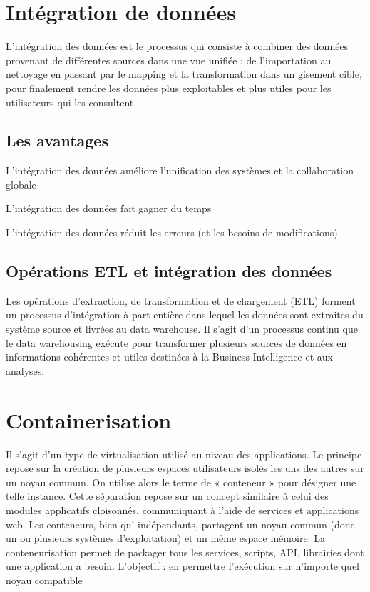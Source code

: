 \section{Intégration de données}
L’intégration des données est le processus qui consiste à combiner des données provenant de différentes
sources dans une vue unifiée : de l’importation au nettoyage en passant par le mapping et la transformation dans un gisement cible, pour finalement rendre les données plus exploitables et plus utiles pour les
utilisateurs qui les consultent.
\subsection{Les avantages}
\begin{list}{•}
	\item L’intégration des données améliore l’unification des systèmes et la collaboration globale
	\item L’intégration des données fait gagner du temps
	\item L’intégration des données réduit les erreurs (et les besoins de modifications)
\end{list}
\subsection{Opérations ETL et intégration des données}
Les opérations d’extraction, de transformation et de chargement (ETL) forment un processus d’intégration
à part entière dans lequel les données sont extraites du système source et livrées au data warehouse. Il s’agit
d’un processus continu que le data warehousing exécute pour transformer plusieurs sources de données en
informations cohérentes et utiles destinées à la Business Intelligence et aux analyses.
\section{Containerisation}
Il s’agit d’un type de virtualisation utilisé au niveau des applications. Le principe repose sur la création de
plusieurs espaces utilisateurs isolés les uns des autres sur un noyau commun. On utilise alors le terme de
« conteneur » pour désigner une telle instance. Cette séparation repose sur un concept similaire à celui des
modules applicatifs cloisonnés, communiquant à l’aide de services et applications web. Les conteneurs,
bien qu’ indépendants, partagent un noyau commun (donc un ou plusieurs systèmes d’exploitation) et un
même espace mémoire.
La conteneurisation permet de packager tous les services, scripts, API, librairies dont une application a
besoin. L’objectif : en permettre l’exécution sur n’importe quel noyau compatible
